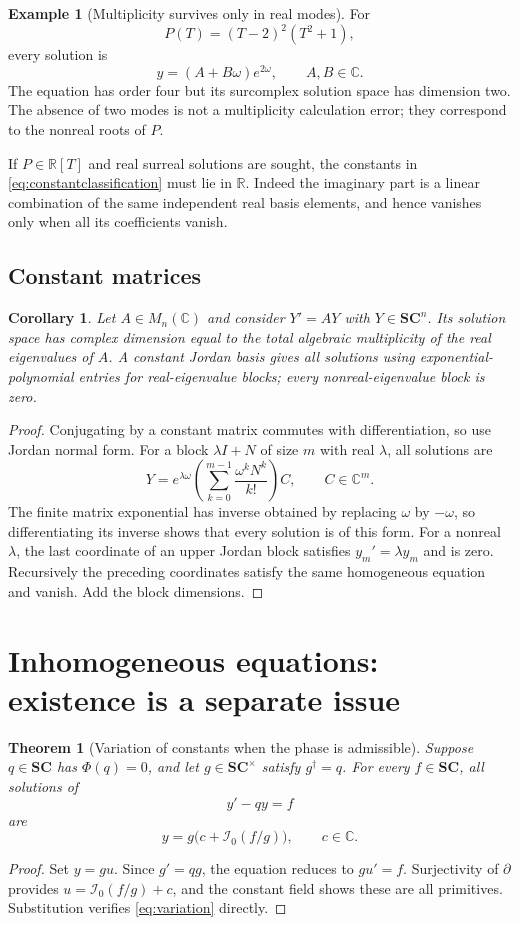 \documentclass[11pt,letterpaper]{article}
\numberwithin{equation}{section}
\newtheorem{theorem}{Theorem}[section]
\newtheorem{corollary}[corollary]{Corollary}
\theoremstyle{definition}
\newtheorem{example}[example]{Example}
\theoremstyle{remark}
\newcommand{\SC}{\mathbf{SC}}
\newcommand{\R}{\mathbb R}
\newcommand{\C}{\mathbb C}
\newcommand{\der}{\partial}
\newcommand{\Izero}{\mathcal I_0}
\begin{document}
\begin{example}[Multiplicity survives only in real modes]
For
\[
 P(T)=(T-2)^2(T^2+1),
\]
every solution is
\[
 y=(A+B\omega)e^{2\omega},\qquad A,B\in\C.
\]
The equation has order four but its surcomplex solution space has dimension two. The absence of two modes is not a multiplicity calculation error; they correspond to the nonreal roots of $P$.
\end{example}

If $P\in\R[T]$ and real surreal solutions are sought, the constants in \eqref{eq:constantclassification} must lie in $\R$. Indeed the imaginary part is a linear combination of the same independent real basis elements, and hence vanishes only when all its coefficients vanish.

\subsection{Constant matrices}
\begin{corollary}\label{cor:matrix}
Let $A\in M_n(\C)$ and consider $Y'=AY$ with $Y\in\SC^n$. Its solution space has complex dimension equal to the total algebraic multiplicity of the real eigenvalues of $A$. A constant Jordan basis gives all solutions using exponential-polynomial entries for real-eigenvalue blocks; every nonreal-eigenvalue block is zero.
\end{corollary}
\begin{proof}
Conjugating by a constant matrix commutes with differentiation, so use Jordan normal form. For a block $\lambda I+N$ of size $m$ with real $\lambda$, all solutions are
\[
 Y=e^{\lambda\omega}\left(\sum_{k=0}^{m-1}\frac{\omega^kN^k}{k!}\right)C,
 \qquad C\in\C^m.
\]
The finite matrix exponential has inverse obtained by replacing $\omega$ by $-\omega$, so differentiating its inverse shows that every solution is of this form. For a nonreal $\lambda$, the last coordinate of an upper Jordan block satisfies $y_m'=\lambda y_m$ and is zero. Recursively the preceding coordinates satisfy the same homogeneous equation and vanish. Add the block dimensions.
\end{proof}

\section{Inhomogeneous equations: existence is a separate issue}\label{sec:inhom}

\begin{theorem}[Variation of constants when the phase is admissible]\label{thm:variation}
Suppose $q\in\SC$ has $\Phi(q)=0$, and let $g\in\SC^\times$ satisfy $g^\dagger=q$. For every $f\in\SC$, all solutions of
\[
 y'-qy=f
\]
are
\begin{equation}\label{eq:variation}
 y=g\bigl(c+\Izero(f/g)\bigr),\qquad c\in\C.
\end{equation}
\end{theorem}
\begin{proof}
Set $y=gu$. Since $g'=qg$, the equation reduces to $gu'=f$. Surjectivity of $\der$ provides $u=\Izero(f/g)+c$, and the constant field shows these are all primitives. Substitution verifies \eqref{eq:variation} directly.
\end{proof}
\end{document}

